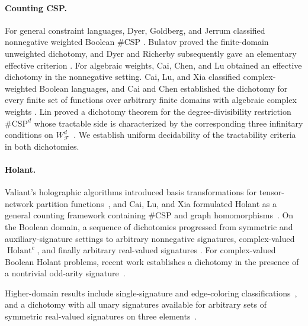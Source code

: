 \documentclass[11pt,letterpaper,onecolumn]{article}
\theoremstyle{plain}
\theoremstyle{definition}
\theoremstyle{remark}
\newcommand{\cF}{\mathcal F}
\newcommand{\WFdeg}[1]{W_{\cF}^{#1}}
\begin{document}
\paragraph{Counting CSP.}
For general constraint languages, Dyer, Goldberg, and Jerrum classified
nonnegative weighted Boolean $\#\mathrm{CSP}$
\cite{DyerGoldbergJerrum2009}. Bulatov proved the finite-domain unweighted
dichotomy, and Dyer and Richerby subsequently gave an elementary effective
criterion
\cite{Bulatov2013,DyerRicherby2013}.  For algebraic weights, Cai, Chen, and
Lu obtained an effective dichotomy in the nonnegative setting. Cai, Lu, and
Xia classified complex-weighted Boolean languages, and Cai and Chen
established the dichotomy for every finite set of functions over arbitrary
finite domains with
algebraic complex weights
\cite{CaiChenLu2016,CaiLuXia2014,CaiChen2017}.  Lin proved a dichotomy
theorem for the degree-divisibility restriction $\#\mathrm{CSP}^{d}$
whose tractable side is characterized by the corresponding three infinitary
conditions on $\WFdeg{d}$~\cite[Theorem~3]{Lin2021}.  We establish
uniform decidability of the tractability criteria in both dichotomies.

\paragraph{Holant.}
Valiant's holographic algorithms introduced basis transformations for
tensor-network partition functions~\cite{Valiant2008}, and Cai, Lu, and Xia
formulated Holant as a general counting framework containing $\#\mathrm{CSP}$
and graph homomorphisms~\cite{CaiLuXia2009}.  On the Boolean domain, a
sequence of dichotomies progressed from symmetric and auxiliary-signature
settings to arbitrary nonnegative signatures, complex-valued
$\operatorname{Holant}^{c}$, and finally
arbitrary real-valued signatures
\cite{CaiGuoWilliams2016,LinWang2018,
Backens2021,Backens2025,ShaoCai2020}.  For complex-valued Boolean Holant problems, recent work establishes a
dichotomy in the presence of a nontrivial odd-arity
signature~\cite{MengWangXiaZheng2025,GuanShaoShi2026}.

Higher-domain results include single-signature and edge-coloring
classifications~\cite{CaiLuXia2013,CaiGuoWilliams2014,LiuFanCai2025},
and a dichotomy with all unary signatures available for arbitrary sets of
symmetric real-valued signatures on three elements~\cite{CaiIhm2025}.
\end{document}
